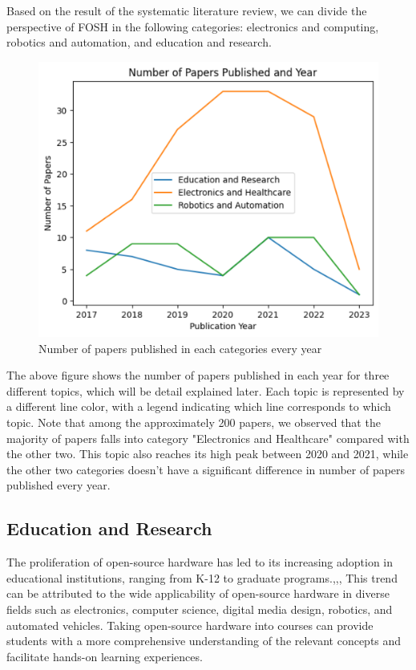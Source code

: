 \documentclass[final-report.tex]{subfiles}
\begin{document}
Based on the result of the systematic literature review, we can divide the perspective of FOSH in the following categories: electronics and computing, robotics and automation, and education and research.

\begin{figure}[!h]
    \begin{minipage}{0.48\textwidth}
        \centering
        \includegraphics[width=\textwidth]{../Images/num_paper_vs_year.png}
        \caption{Number of papers published in each categories every year}
        \label{fig:1}
    \end{minipage}
\end{figure}
The above figure shows the number of papers published in each year for three different topics, which will be detail explained later. Each topic is represented by a different line color, with a legend indicating which line corresponds to which topic. Note that among the approximately 200 papers, we observed that the majority of papers falls into category "Electronics and Healthcare" compared with the other two. This topic also reaches its high peak between 2020 and 2021, while the other two categories doesn't have a significant difference in number of papers published every year. 


\subsection{Education and Research}

The proliferation of open-source hardware has led to its increasing adoption in educational institutions, ranging from K-12 to graduate programs.\cite{martinez2017open},\cite{beal2020stabilizing},\cite{cabrera2019integration},\cite{mondada2017bringing}
This trend can be attributed to the wide applicability of open-source hardware in diverse fields such as electronics\cite{papazoglou2017openhardsim}, computer science, digital media design\cite{chen2021research}, robotics\cite{vrochidou2018open}, and automated vehicles\cite{nakamoto2019development}. 
Taking open-source hardware into courses can provide students with a more comprehensive understanding of the relevant concepts and facilitate hands-on learning experiences.\cite{chen2021research}
\end{document}
